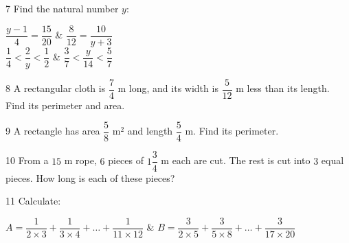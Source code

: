 \gap
\begin{probbox}{7}{\relax}
Find the natural number $y$:
\begin{cols2}
 $\dfrac{y-1}{4}=\dfrac{15}{20}$ &  $\dfrac8{12}=\dfrac{10}{y+3}$\\
 $\dfrac14<\dfrac2y<\dfrac12$ &  $\dfrac37<\dfrac{y}{14}<\dfrac57$
\end{cols2}
\end{probbox}
\gap
\begin{probbox}{8}{\relax}
A rectangular cloth is $\dfrac74$ m long, and its width is $\dfrac5{12}$ m less than its length. Find its perimeter and area.
\end{probbox}
\gap
\begin{probbox}{9}{\relax}
A rectangle has area $\dfrac58$ m$^2$ and length $\dfrac54$ m. Find its perimeter.
\end{probbox}
\gap
\begin{probbox}{10}{\relax}
From a $15$ m rope, $6$ pieces of $1\dfrac34$ m each are cut. The rest is cut into $3$ equal pieces. How long is each of these pieces?
\end{probbox}
\gap
\begin{probbox}{11}{\relax}
Calculate:
\begin{cols2}
$A=\dfrac1{2\times3}+\dfrac1{3\times4}+\dots+\dfrac1{11\times12}$ & $B=\dfrac3{2\times5}+\dfrac3{5\times8}+\dots+\dfrac3{17\times20}$
\end{cols2}
\end{probbox}
